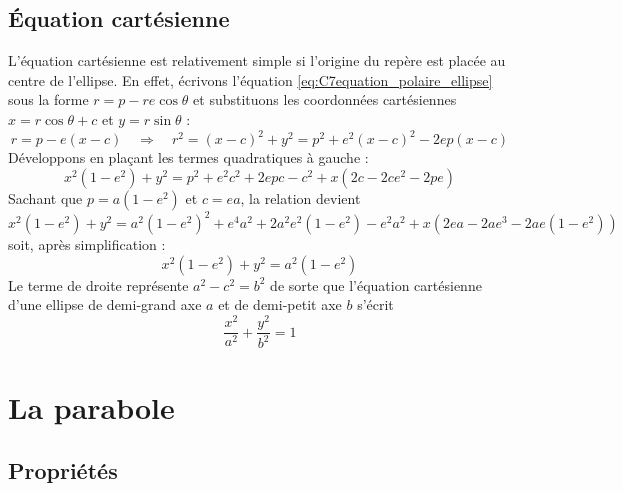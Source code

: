 \subsection{Équation cartésienne}
L'équation cartésienne est relativement simple si l'origine du repère est placée au centre de l'ellipse. En effet, écrivons l'équation \eqref{eq:C7equation_polaire_ellipse} sous la forme $r=p-re\cos\theta$ et substituons les coordonnées cartésiennes $x=r\cos\theta+c$  et $y=r\sin\theta$ :
\[	
r=p-e(x-c)
\quad\Longrightarrow\quad
r^2=(x-c)^2+y^2=p^2+e^2(x-c)^2-2ep(x-c)
\]
Développons en plaçant les termes quadratiques à gauche :
\[
x^2(1-e^2)+y^2=p^2+e^2c^2+2epc-c^2+x(2c-2ce^2-2pe)
\]
Sachant que $p=a(1-e^2)$ et $c=ea$, la relation devient
\[
x^2(1-e^2)+y^2=a^2(1-e^2)^2+e^4a^2+2a^2e^2(1-e^2)-e^2a^2+x\left(2ea-2ae^3-2ae(1-e^2)\right) 
\]
soit, après simplification :
\begin{equation}
x^2(1-e^2)+y^2=a^2(1-e^2)
\label{eq:C7equation_cartesienne_conique}
\end{equation}
Le terme de droite représente $a^2-c^2=b^2$ de sorte que l'équation cartésienne d'une ellipse de demi-grand axe $a$ et de demi-petit axe $b$ s'écrit 
\begin{equation}
\boxed{\frac{x^{2}}{a^{2}}+\frac{y^{2}}{b^{2}}=1}
\label{eq:C7equation_cartesienne_ellipse}
\end{equation}




\section{La parabole}
\subsection{Propriétés}

